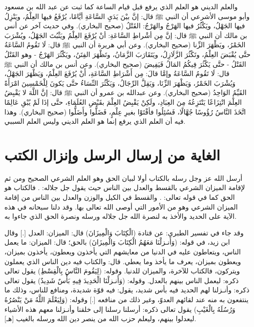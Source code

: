 والعلم الديني هو العلم الذي يرفع قبل قيام الساعة كما ثبت عن عبد الله بن مسعود وأبو موسى الأشرعي أن النبي ﷺ قال: 
إنَّ بيْنَ يَدَيِ السَّاعَةِ أيَّامًا، يُرْفَعُ فيها العِلْمُ، ويَنْزِلُ فيها الجَهْلُ، ويَكْثُرُ فيها الهَرْجُ والهَرْجُ: القَتْلُ {\footnotesize (صحيح البخاري)}. وفي حديث آخر عن أنس بن مالك أن النبي ﷺ قال: إنَّ مِن أشْراطِ السَّاعَةِ: أنْ يُرْفَعَ العِلْمُ ويَثْبُتَ الجَهْلُ، ويُشْرَبَ الخَمْرُ، ويَظْهَرَ الزِّنا {\footnotesize (صحيح البخاري)}. وعن أبي هريرة أن النبي ﷺ قال: لَا تَقُومُ السَّاعَةُ حتَّى يُقْبَضَ العِلْمُ، وتَكْثُرَ الزَّلَازِلُ، ويَتَقَارَبَ الزَّمَانُ، وتَظْهَرَ الفِتَنُ، ويَكْثُرَ الهَرْجُ - وهو القَتْلُ القَتْلُ - حتَّى يَكْثُرَ فِيكُمُ المَالُ فَيَفِيضَ {\footnotesize (صحيح البخاري)}. وعن أنس بن مالك أن النبي ﷺ قال: 
لَا تَقُومُ السَّاعَةُ وإمَّا قالَ: مِن أَشْرَاطِ السَّاعَةِ، أَنْ يُرْفَعَ العِلْمُ، وَيَظْهَرَ الجَهْلُ، وَيُشْرَبَ الخَمْرُ، وَيَظْهَرَ الزِّنَا، وَيَقِلَّ الرِّجَالُ، وَيَكْثُرَ النِّسَاءُ حتَّى يَكونَ لِلْخَمْسِينَ امْرَأَةً القَيِّمُ الوَاحِدُ {\footnotesize (صحيح البخاري)}. وعن عبدالله بن عمرو أن النبي ﷺ قال: إنَّ اللَّهَ لا يَقْبِضُ العِلْمَ انْتِزَاعًا يَنْتَزِعُهُ مِنَ العِبَادِ، ولَكِنْ يَقْبِضُ العِلْمَ بقَبْضِ العُلَمَاءِ، حتَّى إذَا لَمْ يُبْقِ عَالِمًا اتَّخَذَ النَّاسُ رُؤُوسًا جُهَّالًا، فَسُئِلُوا فأفْتَوْا بغيرِ عِلْمٍ، فَضَلُّوا وأَضَلُّوا {\footnotesize (صحيح البخاري)}. وهذا فيه أن العلم الذي يرفع إنما هو العلم الديني وليس العلم السببي.

\section{الغاية من إرسال الرسل وإنزال الكتب}

أرسل الله عز وجل رسله بالكتاب أولا لبيان الحق وهو العلم الشرعي الصحيح ومن ثم لإقامة الميزان الشرعي بالقسط والعدل بين الناس حيث يقول جل جلاله:
\quranayah*[57][25]{\footnotesize \surahname*[57]}. فالكتاب هو الحق كما في قوله تعالى: \quranayah*[2][144][21]{\footnotesize \surahname*[2]}. والقسط في الكيل والوزن والعدل بين الناس من إقامة الميزان الشرعي وهو من الأمور التي أوصى الله تعالى بها. وقد دلنا سبحانه في هذه الآية على الحديد والأخذ به لنصرة الله جل جلاله ورسله ونصرة الحق الذي جاءوا به. 

وقد جاء في تفسير الطبري: عن قتادة (الْكِتَابَ وَالْمِيزَانَ) قال: الميزان: العدل [.] وقال ابن زيد، في قوله: (وَأَنـزلْنَا مَعَهُمُ الْكِتَابَ وَالْمِيزَانَ) بالحق؛ قال: الميزان: ما يعمل الناس، ويتعاطون عليه في الدنيا من معايشهم التي يأخذون ويعطون، يأخذون بميزان، ويعطون بميزان، يعرف ما يأخذ وما يعطي. قال: والكتاب فيه دين الناس الذي يعملون ويتركون، فالكتاب للآخرة، والميزان للدنيا. وقوله: (لِيَقُومَ النَّاسُ بِالْقِسْطِ) يقول تعالى ذكره: ليعمل الناس بينهم بالعدل. وقوله: (وَأَنـزلْنَا الْحَدِيدَ فِيهِ بَأْسٌ شَدِيدٌ) يقول تعالى ذكره: وأنـزلنا لهم الحديد فيه بأس شديد، يقول: فيه قوّة شديدة، ومنافع للناس، وذلك ما ينتفعون به منه عند لقائهم العدوّ، وغير ذلك من منافعه [.] وقوله: (وَلِيَعْلَمَ اللَّهُ مَنْ يَنْصُرُهُ وَرُسُلَهُ بِالْغَيْبِ) يقول تعالى ذكره: أرسلنا رسلنا إلى خلقنا وأنـزلنا معهم هذه الأشياء ليعدلوا بينهم، وليعلم حزب الله من ينصر دين الله ورسله بالغيب [هـ]. 

